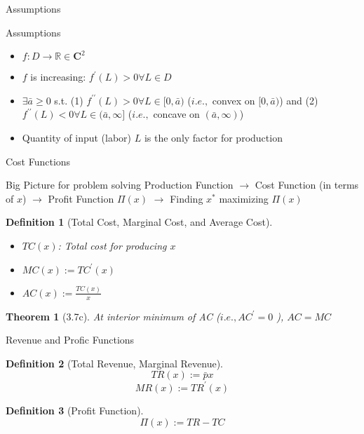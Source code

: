 \documentclass[final]{beamer}
\newtheorem{defn}{Definition}
\newtheorem{thm}{Theorem}
\begin{document}
\begin{frame}[t]{Assumptions}
	\begin{block}
		{Assumptions}
		\begin{itemize}
			\item $f:D\rightarrow\mathbb{R}\in \mathbf{C}^2$
			\item $f$ is increasing: $f^\prime(L) >0 \forall L\in D$
			\item $\exists \bar a\ge 0$ s.t. (1) $f^{\prime\prime}(L)>0 \forall L\in[0,\bar a)$ ($i.e.,$ convex on $[0,\bar a)$) and (2) $f^{\prime\prime}(L)<0 \forall L\in(\bar a,\infty]$ ($i.e.,$ concave on $(\bar a,\infty)$)
			\item Quantity of input (labor) $L$ is the only factor for production
		\end{itemize}
	\end{block}

\end{frame}


\begin{frame}[t]{Cost Functions}
	\begin{block}
		{Big Picture for problem solving}
		Production Function $\rightarrow$ Cost Function (in terms of $x$) $\rightarrow$ Profit Function $\Pi(x)$ $\rightarrow$ Finding $x^\ast$ maximizing $\Pi(x)$
	\end{block}
	
	\begin{defn}
		[Total Cost, Marginal Cost, and Average Cost]
		\begin{itemize}
			\item $TC(x)$: Total cost for producing $x$
			\item $MC(x):= TC^\prime(x)$
			\item $AC(x):= \frac{TC(x)}{x}$
		\end{itemize}
	\end{defn}
	
	\begin{thm}
		[3.7c]
		At interior minimum of AC ($i.e.,AC^\prime=0$ ), $AC=MC$
	\end{thm}
\end{frame}

\begin{frame}[t]{Revenue and Profic Functions}
	\begin{defn}
		[Total Revenue, Marginal Revenue]
		\[
			TR(x) := \bar p x
		\]
		\[
			MR(x) := TR^\prime (x)
		\]
	\end{defn}
	\begin{defn}
		[Profit Function]
		\[
			\Pi(x) := TR-TC
		\]
	\end{defn}
\end{frame}
\end{document}
